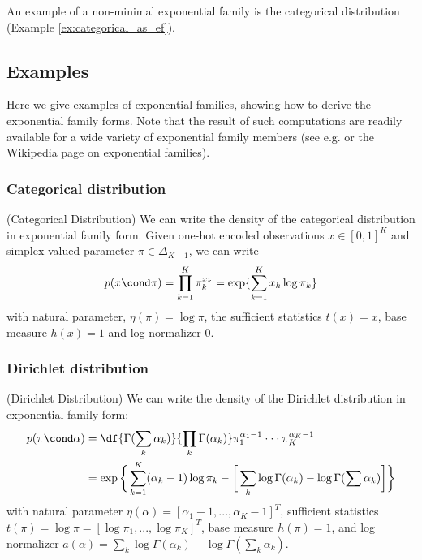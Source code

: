 \documentclass{article} %
\begin{document}
  An example of a non-minimal exponential family is the categorical distribution (Example \ref{ex:categorical_as_ef}). 


\subsection{Examples}

Here we give examples of exponential families, showing how to derive the exponential family forms.   Note that the result of such computations are readily available for a wide variety of exponential family members (see e.g. \cite{nielsen2009statistical} or the Wikipedia page on exponential families). 

 
\subsubsection{Categorical distribution}

\begin{example}{(Categorical Distribution)}
\label{ex:categorical_as_ef} We can write the density of the categorical distribution in exponential family form. 	 Given one-hot encoded observations $x \in [0,1]^K$ and simplex-valued parameter $\pi \in \Delta_{K-1}$, we can write
\[p(x \cond \pi) = \prod_{k=1}^K \pi_k^{x_k} = \exp \{ \sum_{k=1}^K x_k \log \pi_k\} \]
 with natural parameter, $\eta(\pi) = \log \pi$, the sufficient statistics $t(x) = x$, base measure $h(x)=1$ and log normalizer $0$.
\end{example}

\subsubsection{Dirichlet distribution}
\begin{example}{(Dirichlet Distribution)} 
\label{ex:dirichlet_as_ef} We can write the density of the Dirichlet distribution in exponential family form:
\begin{align*}
p (\pi \cond\alpha) &= \df{\Gamma(\sum_k \alpha_k)}{\prod_k \Gamma (\alpha_k) } \pi_1^{\alpha_1 -1} \cdot \cdot \cdot \pi_K^{\alpha_K -1} \\
&= \exp \bigg\{ \sum_{k=1}^K (\alpha_k -1) \log \pi_k - \bigg[ \sum_k \log \Gamma (\alpha_k)-  \log \Gamma (\sum \alpha_k) \bigg]  \bigg\}
\end{align*}
with natural parameter $\eta(\alpha) = [\alpha_1 -1, ..., \alpha_K -1]^T$, sufficient statistics $t(\pi) = \log \pi = [\log \pi_1, ..., \log \pi_K]^T$, base measure $h(\pi)=1$, and log normalizer $a(\alpha) =  \sum_k \log \Gamma (\alpha_k ) - \log \Gamma (\sum_k \alpha_k)$. 
  
\end{example} 
\end{document}
